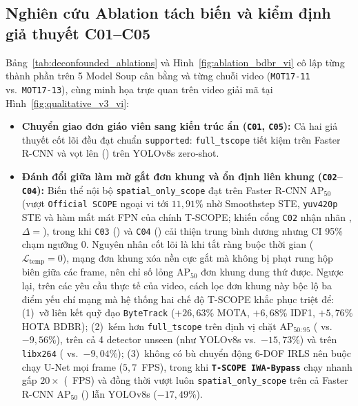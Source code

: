 \documentclass[journal]{IEEEtran}
\begin{document}
\subsection{Nghiên cứu Ablation tách biến và kiểm định giả thuyết C01--C05}
Bảng~\ref{tab:deconfounded_ablations} và Hình~\ref{fig:ablation_bdbr_vi} cô lập từng thành phần trên 5 Model Soup cân bằng và từng chuỗi video (\texttt{MOT17-11} vs.\ \texttt{MOT17-13}), cùng minh họa trực quan trên video giải mã tại Hình~\ref{fig:qualitative_v3_vi}:
\begin{itemize}
    \item \textbf{Chuyển giao đơn giáo viên sang kiến trúc ẩn (\texttt{C01}, \texttt{C05}):} Cả hai giả thuyết cốt lõi đều đạt chuẩn \texttt{supported}: \texttt{full\_tscope} tiết kiệm \tscopeFullTotBdbrFrcnnApFifty{} trên Faster R-CNN và vọt lên \tscopeFullTotBdbrYoloApFifty{} (\tscopeFullTotBdbrYoloApFiftyCi{}) trên YOLOv8s zero-shot.
    \item \textbf{Đánh đổi giữa làm mờ gắt đơn khung và ổn định liên khung (\texttt{C02}--\texttt{C04}):} Biến thể nội bộ \texttt{spatial\_only\_scope} đạt \tscopeSpatialTotBdbrFrcnnApFifty{} trên Faster R-CNN $\mathrm{AP}_{50}$ (vượt \texttt{Official SCOPE} ngoại vi \tscopeOffScopeTotBdbrFrcnnApFifty{} tới $11{,}91\%$ nhờ Smoothstep STE, \texttt{yuv420p} STE và hàm mất mát FPN của chính T-SCOPE; khiến cổng \texttt{C02} nhận nhãn \tscopeClaimTwoStatus{}, $\Delta{=}$\tscopeClaimTwoDelta{}), trong khi \texttt{C03} (\tscopeClaimThreeDelta{}) và \texttt{C04} (\tscopeClaimFourDelta{}) cải thiện trung bình dương nhưng CI 95\% chạm ngưỡng $0$. Nguyên nhân cốt lõi là khi tắt ràng buộc thời gian ($\mathcal{L}_{\mathrm{temp}}=0$), mạng đơn khung xóa nền cực gắt mà không bị phạt rung hộp biên giữa các frame, nên chỉ số lỏng $\mathrm{AP}_{50}$ đơn khung dung thứ được. Ngược lại, trên các yêu cầu thực tế của video, cách lọc đơn khung này bộc lộ ba điểm yếu chí mạng mà hệ thống hai chế độ T-SCOPE khắc phục triệt để: (1)~vỡ liên kết quỹ đạo \texttt{ByteTrack} ($+26{,}63\%$ MOTA, $+6{,}68\%$ IDF1, $+5{,}76\%$ HOTA BDBR); (2)~kém hơn \texttt{full\_tscope} trên định vị chặt $\mathrm{AP}_{50:95}$ (\tscopeFullTotBdbrFrcnnApNinetyFive{} vs.\ $-9{,}56\%$), trên cả 4 detector unseen (như YOLOv8s \tscopeFullTotBdbrYoloApFifty{} vs.\ $-15{,}73\%$) và trên \texttt{libx264} (\tscopeAvcFullBdbrFrcnnApFifty{} vs.\ $-9{,}04\%$); (3)~không có bù chuyển động 6-DOF IRLS nên buộc chạy U-Net mọi frame ($5{,}7$~FPS), trong khi \textbf{\texttt{T-SCOPE IWA-Bypass}} chạy nhanh gấp $20\times$ (\tscopeIwaFps{}~FPS) và đồng thời vượt luôn \texttt{spatial\_only\_scope} trên cả Faster R-CNN $\mathrm{AP}_{50}$ (\tscopeIwaTotBdbrFrcnnApFifty{}) lẫn YOLOv8s ($-17{,}49\%$).
\end{itemize}
\end{document}

